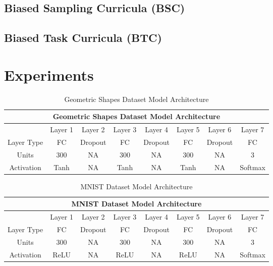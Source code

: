 \subsection{Biased Sampling Curricula (BSC)}

\subsection{Biased Task Curricula (BTC)}
 

\section{Experiments}

\begin{table}[h]
\caption{Geometric Shapes Dataset Model Architecture} \label{tab:GeoArchitecture}
\begin{tabular}{|c||c|c|c|c|c|c|c|}
\hline
\multicolumn{8}{|c|}{Geometric Shapes Dataset Model Architecture} \\
\hline
 & Layer 1 & Layer 2 & Layer 3& Layer 4 &Layer 5 & Layer 6 & Layer 7 \\
\hline
\hline
Layer Type & FC & Dropout & FC & Dropout & FC & Dropout  & FC \\
\hline
Units & 300 & NA & 300 & NA & 300 & NA & 3 \\
\hline
Activation & Tanh & NA & Tanh & NA & Tanh & NA & Softmax \\
\hline
\end{tabular}
\end{table}

\begin{table}[h]
\caption{MNIST Dataset Model Architecture} \label{tab:MNISTArchitecture}
\begin{tabular}{|c||c|c|c|c|c|c|c|}
\hline
\multicolumn{8}{|c|}{MNIST Dataset Model Architecture} \\
\hline
 & Layer 1 & Layer 2 & Layer 3& Layer 4 &Layer 5 & Layer 6 & Layer 7 \\
\hline
\hline
Layer Type & FC & Dropout & FC & Dropout & FC & Dropout  & FC \\
\hline
Units & 300 & NA & 300 & NA & 300 & NA & 3 \\
\hline
Activation & ReLU & NA & ReLU & NA & ReLU & NA & Softmax \\
\hline
\end{tabular}
\end{table}

